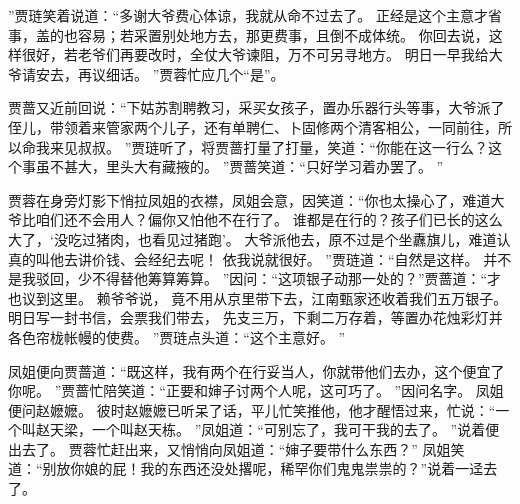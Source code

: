 ”贾琏笑着说道：“多谢大爷费心体谅，我就从命不过去了。
正经是这个主意才省事，盖的也容易；若采置别处地方去，那更费事，且倒不成体统。
你回去说，这样很好，若老爷们再要改时，全仗大爷谏阻，万不可另寻地方。
明日一早我给大爷请安去，再议细话。
”贾蓉忙应几个“是”。
\par
贾蔷又近前回说：“下姑苏割聘教习，采买女孩子，置办乐器行头等事，大爷派了侄儿，带领着来管家两个儿子，还有单聘仁、卜固修两个清客相公，一同前往，所以命我来见叔叔。
”贾琏听了，将贾蔷打量了打量，笑道：“你能在这一行么？这个事虽不甚大，里头大有藏掖的。
”贾蔷笑道：“只好学习着办罢了。
”\par
贾蓉在身旁灯影下悄拉凤姐的衣襟，凤姐会意，因笑道：“你也太操心了，难道大爷比咱们还不会用人？偏你又怕他不在行了。
谁都是在行的？孩子们已长的这么大了，‘没吃过猪肉，也看见过猪跑’。
大爷派他去，原不过是个坐纛旗儿，难道认真的叫他去讲价钱、会经纪去呢！
依我说就很好。
”贾琏道：“自然是这样。
并不是我驳回，少不得替他筹算筹算。
”因问：“这项银子动那一处的？”贾蔷道：“才也议到这里。
赖爷爷说，
竟不用从京里带下去，江南甄家还收着我们五万银子。
明日写一封书信，会票我们带去，
先支三万，下剩二万存着，等置办花烛彩灯并各色帘栊帐幔的使费。
”贾琏点头道：“这个主意好。
”\par
凤姐便向贾蔷道：“既这样，我有两个在行妥当人，你就带他们去办，这个便宜了你呢。
”贾蔷忙陪笑道：“正要和婶子讨两个人呢，这可巧了。
”因问名字。
凤姐便问赵嬷嬷。
彼时赵嬷嬷已听呆了话，平儿忙笑推他，他才醒悟过来，忙说：“一个叫赵天梁，一个叫赵天栋。
”凤姐道：“可别忘了，我可干我的去了。
”说着便出去了。
贾蓉忙赶出来，又悄悄向凤姐道：“婶子要带什么东西？” 凤姐笑道：“别放你娘的屁！我的东西还没处撂呢，稀罕你们鬼鬼祟祟的？”说着一迳去了。
